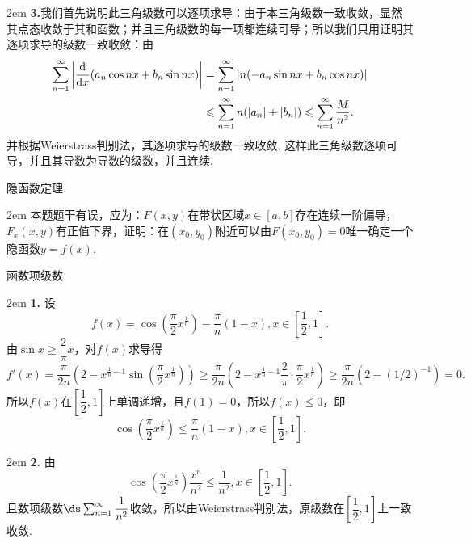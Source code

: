 \documentclass[UTF8,14pt,normal]{ctexart}
\begin{document}
    \hangindent 2em
    \noindent
    \textbf{3.}我们首先说明此三角级数可以逐项求导：由于本三角级数一致收敛，显然其点态收敛于其和函数；并且三角级数的每一项都连续可导；所以我们只用证明其逐项求导的级数一致收敛：由
    \begin{equation*}
        \begin{split}
            \sum_{n=1}^{\infty}\left\lvert\dv{x}(a_n\cos nx+b_n\sin nx)\right\rvert &= \sum_{n=1}^{\infty}|n(-a_n\sin nx+b_n\cos nx)|\\
            &\leqslant\sum_{n=1}^{\infty}n(|a_n|+|b_n|)\leqslant\sum_{n=1}^{\infty}\frac{M}{n^2}.
        \end{split}
    \end{equation*}
    并根据Weierstrass判别法，其逐项求导的级数一致收敛. 这样此三角级数逐项可导，并且其导数为导数的级数，并且连续.

\clearpage
{} 隐函数定理

    \hangindent 2em
    \noindent
    本题题干有误，应为：\(F(x,y)\)在带状区域\(x\in[a,b]\)存在连续一阶偏导，\(F_x(x,y)\)有正值下界，证明：在\((x_0,y_0)\)附近可以由\(F(x_0,y_0) = 0\)唯一确定一个隐函数\(y = f(x)\).

 函数项级数

    \hangindent 2em
    \noindent
    \textbf{1.}
    设\[f(x) = \cos(\dfrac{\pi}{2}x^{\frac{1}{n}}) - \dfrac{\pi}{n}(1-x), x\in\left[\frac{1}{2}, 1\right].\]
    由\(\sin x\geqslant \dfrac{2}{\pi}x\)，对\(f(x)\)求导得\[f'(x) = \frac{\pi}{2n}\left(2-x^{\frac{1}{n}-1}\sin(\frac{\pi}{2}x^{\frac{1}{n}})\right)\geqslant\frac{\pi}{2n}\left(2-x^{\frac{1}{n}-1}\frac{2}{\pi}\cdot\frac{\pi}{2}x^{\frac{1}{n}}\right)\geqslant\frac{\pi}{2n}(2-(1/2)^{-1}) = 0.\]
    所以\(f(x)\)在\(\left[\dfrac{1}{2}, 1\right]\)上单调递增，且\(f(1) = 0\)，所以\(f(x)\leqslant0\)，即\[\cos(\frac{\pi}{2}x^{\frac{1}{n}})\leqslant\frac{\pi}{n}(1-x), x\in\left[\dfrac{1}{2}, 1\right].\]

    \hangindent 2em
    \noindent
    \textbf{2.}
    由\[\cos(\frac{\pi}{2}x^{\frac{1}{n}})\frac{x^n}{n^2}\leqslant\frac{1}{n^2},x\in\left[\frac{1}{2},1\right].\]
    且数项级数\(\ds \sum_{n=1}^{\infty}\dfrac{1}{n^2}\)收敛，所以由Weierstrass判别法，原级数在\(\left[\dfrac{1}{2}, 1\right]\)上一致收敛.
\end{document}

